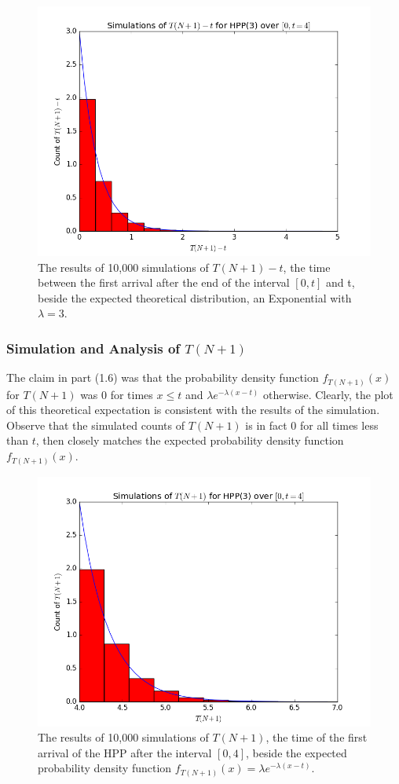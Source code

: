\documentclass[11pt, oneside]{article}   	%
\begin{document}
\begin{figure}[H]
\includegraphics[scale=.45]{hpp_tn1_t}
\caption{The results of 10,000 simulations of $T(N+1)-t$, the time between the first arrival after the end of the interval $[0,t]$ and t, beside the expected theoretical distribution, an Exponential with $\lambda=3$.}
\label{fig:x}
\end{figure}

\subsubsection{Simulation and Analysis of $T(N+1)$}
The claim in part (1.6) was that the probability density function $f_{T(N+1)}(x)$ for $T(N+1)$ was 0 for times $x \leq t$ and $\lambda e^{-\lambda (x - t)}$ otherwise. Clearly, the plot of this theoretical expectation is consistent with the results of the simulation. Observe that the simulated counts of $T(N+1)$ is in fact 0 for all times less than $t$, then closely matches the expected probability density function $f_{T(N+1)}(x)$.
\begin{figure}[H]
\includegraphics[scale=.5]{hpp_tn1}
\caption{The results of 10,000 simulations of $T(N+1)$, the time of the first arrival of the HPP after the interval $[0,4]$, beside the expected probability density function $f_{T(N+1)}(x)=\lambda e^{-\lambda (x - t)}$.}
\label{fig:x}
\end{figure}
\end{document}
